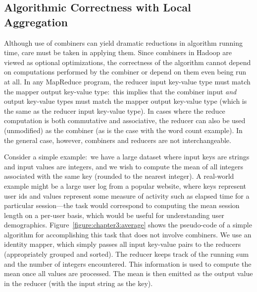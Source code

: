 \subsection{Algorithmic Correctness with Local Aggregation}
\label{chapter3:local-aggregation:correctness}

Although use of combiners can yield dramatic reductions in algorithm
running time, care must be taken in applying them.  Since combiners in
Hadoop are viewed as optional optimizations, the correctness of the
algorithm cannot depend on computations performed by the combiner or
depend on them even being run at all.  In any MapReduce program, the
reducer input key-value type must match the mapper output key-value
type:\ this implies that the combiner input {\it and} output key-value
types must match the mapper output key-value type (which is the same
as the reducer input key-value type).  In cases where the reduce
computation is both commutative and associative, the reducer can also
be used (unmodified) as the combiner (as is the case with the word
count example).  In the general case, however, combiners and reducers
are not interchangeable.

Consider a simple example:\ we have a large dataset where input keys
are strings and input values are integers, and we wish to compute the
mean of all integers associated with the same key (rounded to the
nearest integer).  A real-world example might be a large user log from
a popular website, where keys represent user ids and values represent
some measure of activity such as elapsed time for a particular
session---the task would correspond to computing the mean session
length on a per-user basis, which would be useful for understanding
user demographics.  Figure~\ref{figure:chapter3:average} shows the
pseudo-code of a simple algorithm for accomplishing this task that
does not involve combiners.  We use an identity mapper, which simply
passes all input key-value pairs to the reducers (appropriately
grouped and sorted).  The reducer keeps track of the running sum and
the number of integers encountered.  This information is used to
compute the mean once all values are processed.  The mean is then
emitted as the output value in the reducer (with the input string as
the key).

